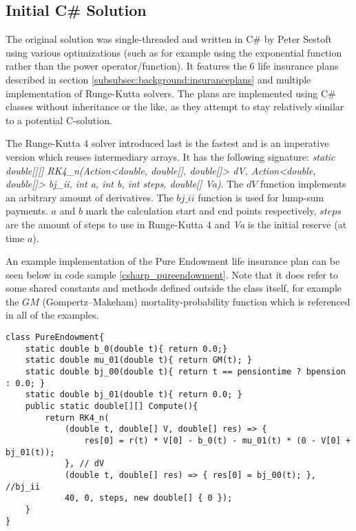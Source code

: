 \subsection{Initial C\# Solution}
The original solution was single-threaded and written in C\# by Peter Sestoft using various optimizations (such as for example using the exponential function rather than the power operator/function).
It features the 6 life insurance plans described in section \ref{subsubsec:background:insuranceplans} and multiple implementation of Runge-Kutta solvers.
The plans are implemented using C\# classes without inheritance or the like, as they attempt to stay relatively similar to a potential C-solution.

The Runge-Kutta 4 solver introduced last is the fastest and is an imperative version which reuses intermediary arrays.
It has the following signature: \textit{static double[][] RK4\_n(Action\textless{}double, double[], double[]\textgreater{} dV, Action\textless{}double, double[]\textgreater{} bj\_ii, int a, int b, int steps, double[] Va)}.
The $dV$ function implements an arbitrary amount of derivatives.
The $bj\_ii$ function is used for lump-sum payments.
$a$ and $b$ mark the calculation start and end points respectively, $steps$ are the amount of steps to use in Runge-Kutta 4 and \textit{Va} is the initial reserve (at time $a$).

An example implementation of the Pure Endowment life insurance plan can be seen below in code sample \ref{csharp_pureendowment}. 
Note that it does refer to some shared constants and methods defined outside the class itself, for example the $GM$ (Gompertz–Makeham) mortality-probability function which is referenced in all of the examples.

\begin{lstlisting}[language=CSharp, caption=The pure endowment insurance plan expressed in C\#, label=csharp_pureendowment]
class PureEndowment{
    static double b_0(double t){ return 0.0;}
    static double mu_01(double t){ return GM(t); }
    static double bj_00(double t){ return t == pensiontime ? bpension : 0.0; }
    static double bj_01(double t){ return 0.0; }
    public static double[][] Compute(){
        return RK4_n(
            (double t, double[] V, double[] res) => { 
                res[0] = r(t) * V[0] - b_0(t) - mu_01(t) * (0 - V[0] + bj_01(t)); 
            }, // dV
            (double t, double[] res) => { res[0] = bj_00(t); }, //bj_ii
            40, 0, steps, new double[] { 0 });
    }
}
\end{lstlisting}

